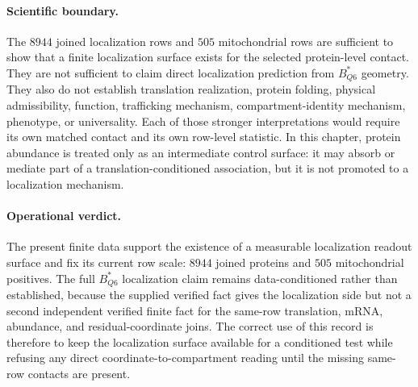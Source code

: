 \paragraph{Scientific boundary.}
The $8944$ joined localization rows and $505$ mitochondrial rows are sufficient to show that a finite localization surface exists for the selected protein-level contact.  They are not sufficient to claim direct localization prediction from $B^{*}_{Q6}$ geometry.  They also do not establish translation realization, protein folding, physical admissibility, function, trafficking mechanism, compartment-identity mechanism, phenotype, or universality.  Each of those stronger interpretations would require its own matched contact and its own row-level statistic.  In this chapter, protein abundance is treated only as an intermediate control surface: it may absorb or mediate part of a translation-conditioned association, but it is not promoted to a localization mechanism.

\paragraph{Operational verdict.}
The present finite data support the existence of a measurable localization readout surface and fix its current row scale: $8944$ joined proteins and $505$ mitochondrial positives.  The full $B^{*}_{Q6}$ localization claim remains data-conditioned rather than established, because the supplied verified fact gives the localization side but not a second independent verified finite fact for the same-row translation, mRNA, abundance, and residual-coordinate joins.  The correct use of this record is therefore to keep the localization surface available for a conditioned test while refusing any direct coordinate-to-compartment reading until the missing same-row contacts are present.
